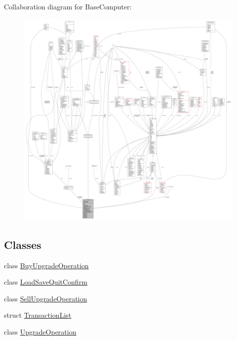 Collaboration diagram for Base\+Computer\+:
\nopagebreak
\begin{figure}[H]
\begin{center}
\leavevmode
\includegraphics[width=350pt]{d6/d68/classBaseComputer__coll__graph}
\end{center}
\end{figure}
\subsection*{Classes}
\begin{DoxyCompactItemize}
\item 
class \hyperlink{classBaseComputer_1_1BuyUpgradeOperation}{Buy\+Upgrade\+Operation}
\item 
class \hyperlink{classBaseComputer_1_1LoadSaveQuitConfirm}{Load\+Save\+Quit\+Confirm}
\item 
class \hyperlink{classBaseComputer_1_1SellUpgradeOperation}{Sell\+Upgrade\+Operation}
\item 
struct \hyperlink{structBaseComputer_1_1TransactionList}{Transaction\+List}
\item 
class \hyperlink{classBaseComputer_1_1UpgradeOperation}{Upgrade\+Operation}
\end{DoxyCompactItemize}

